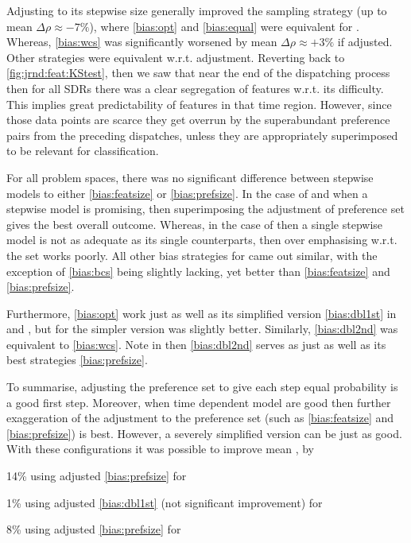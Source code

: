 Adjusting  to its stepwise size generally improved the sampling 
strategy (up to mean $\Delta\rho\approx-7\%$), where \ref{bias:opt} and 
\ref{bias:equal} were equivalent for . 
Whereas,  \ref{bias:wcs} was significantly worsened 
by mean $\Delta\rho\approx+3\%$ if adjusted. Other  strategies 
were equivalent w.r.t. adjustment.
Reverting back to \cref{fig:jrnd:feat:KStest}, then we saw that near the end of 
the dispatching process then for all SDRs there was a clear segregation of 
features w.r.t. its difficulty. This implies great predictability of 
features in that time region. However, since those data points are scarce they 
get overrun by the superabundant preference pairs from the preceding 
dispatches, unless they are appropriately superimposed to be relevant for 
classification.

For all problem spaces, there was no significant difference between stepwise 
models to either \ref{bias:featsize} or \ref{bias:prefsize}. 
In the case of  and  when a stepwise model is 
promising, then superimposing the adjustment of preference set gives the 
best overall outcome. 
Whereas, in the case of  then a single stepwise model is not as 
adequate as its single counterparts, then over emphasising w.r.t. the set works 
poorly. 
All other bias strategies for  came out similar, with the 
exception of \cref{bias:bcs} being slightly lacking, yet better than 
\ref{bias:featsize} and \ref{bias:prefsize}.

Furthermore, \ref{bias:opt} work just as well as its simplified version 
\ref{bias:dbl1st} in  and , but for  
the simpler version was slightly better. 
Similarly, \ref{bias:dbl2nd} was equivalent to \ref{bias:wcs}.
Note in  then \ref{bias:dbl2nd} serves as just as well as its best 
strategies \ref{bias:prefsize}.

To summarise, adjusting the preference set to give each step equal probability 
is a good first step. 
Moreover, when time dependent model are good then further exaggeration of the  
adjustment to the preference set (such as \ref{bias:featsize} and 
\ref{bias:prefsize}) is best. 
However, a severely simplified version can be just as good. 
With these configurations it was possible to improve mean \namerho, by
\begin{enumerate*}
    \item 14\% using adjusted \ref{bias:prefsize} for 
    \item 1\% using adjusted \ref{bias:dbl1st} (not significant improvement) 
    for  
    \item 8\% using adjusted \ref{bias:prefsize} for 
\end{enumerate*}

